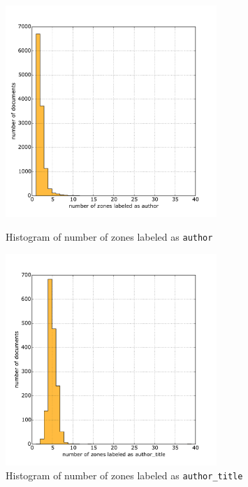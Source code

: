 \begin{appendix}
\begin{figure}
\centering
\begin{minipage}[t!]{0.48\linewidth}
  \includegraphics[width=8cm]{plots/author_histogram}
  \caption{Histogram of number of zones labeled as \texttt{author}}
  \label{fig:author_histogram}
\end{minipage}
\quad
\begin{minipage}[t!]{0.48\linewidth}
  \includegraphics[width=8cm]{plots/author_title_histogram}
  \caption{Histogram of number of zones labeled as \texttt{author\_title}}
  \label{fig:author_title_histogram}
\end{minipage}
\end{figure}


\end{appendix}
